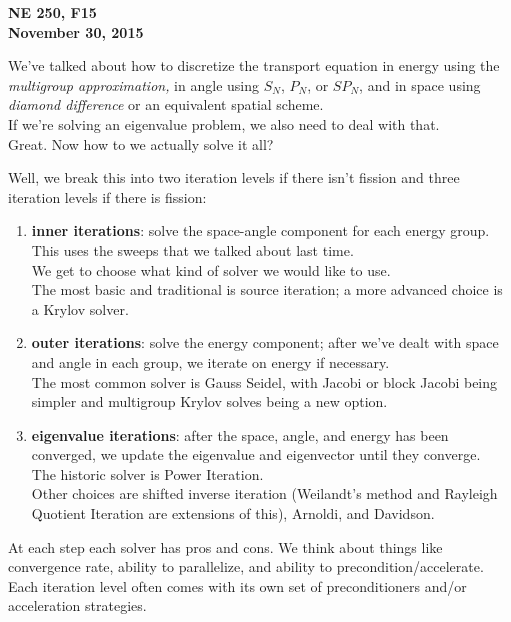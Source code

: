 \documentclass[12pt]{article}
\begin{document}
\begin{center}
{\bf NE 250, F15\\
November 30, 2015 
}
\end{center}

We've talked about how to discretize the transport equation in energy using the \textit{multigroup approximation,} in angle using $S_N$, $P_N$, or $SP_N$, and in space using \textit{diamond difference} or an equivalent spatial scheme. \\
If we're solving an eigenvalue problem, we also need to deal with that.\\
Great. Now how to we actually solve it all? 

Well, we break this into two iteration levels if there isn't fission and three iteration levels if there is fission:
\begin{enumerate}
\item \textbf{inner iterations}: solve the space-angle component for each energy group. This uses the sweeps that we talked about last time. \\
We get to choose what kind of solver we would like to use. \\
The most basic and traditional is source iteration; a more advanced choice is a Krylov solver.

\item \textbf{outer iterations}: solve the energy component; after we've dealt with space and angle in each group, we iterate on energy if necessary. \\
The most common solver is Gauss Seidel, with Jacobi or block Jacobi being simpler and multigroup Krylov solves being a new option.

\item \textbf{eigenvalue iterations}: after the space, angle, and energy has been converged, we update the eigenvalue and eigenvector until they converge.\\
The historic solver is Power Iteration.\\
Other choices are shifted inverse iteration (Weilandt's method and Rayleigh Quotient Iteration are extensions of this), Arnoldi, and Davidson.
\end{enumerate}
At each step each solver has pros and cons. We think about things like convergence rate, ability to parallelize, and ability to precondition/accelerate.\\
Each iteration level often comes with its own set of preconditioners and/or acceleration strategies.
\end{document}
